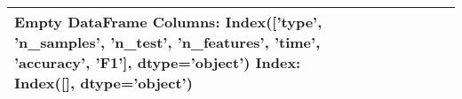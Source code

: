 \begin{tabular}{llllllll}
\toprule
Empty DataFrame
Columns: Index(['type', 'n\_samples', 'n\_test', 'n\_features', 'time', 'accuracy', 'F1'], dtype='object')
Index: Index([], dtype='object') \\
\bottomrule
\end{tabular}
